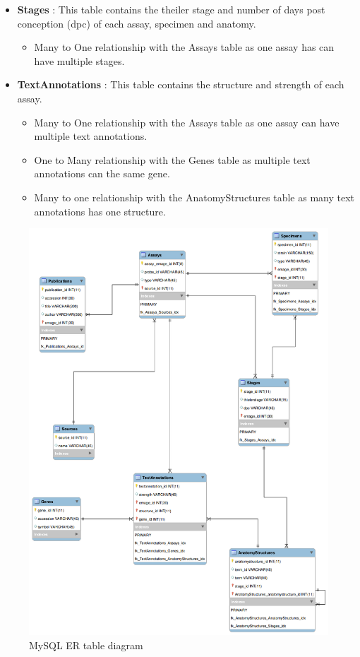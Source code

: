 \begin{itemize}
\item \textbf{Stages} : This table contains the theiler stage and number of days post conception (dpc) of each assay, specimen and anatomy.
\begin{itemize}
\item Many to One relationship with the Assays table as one assay has can have multiple stages.
\end{itemize} 

\item \textbf{TextAnnotations} : This table contains the structure and strength of each assay.
\begin{itemize}
\item Many to One relationship with the Assays table as one assay can have multiple text annotations.
\item One to Many relationship with the Genes table as multiple text annotations can the same gene.
\item Many to one relationship with the AnatomyStructures table as many text annotations has one structure.
\end{itemize} 

\end{itemize}

\newpage
\begin{figure}[H]\begin{center}\includegraphics[width=1\linewidth]{images/emage_erd}\caption{MySQL ER table diagram}\label{fig:mysql}\end{center}\end{figure}

